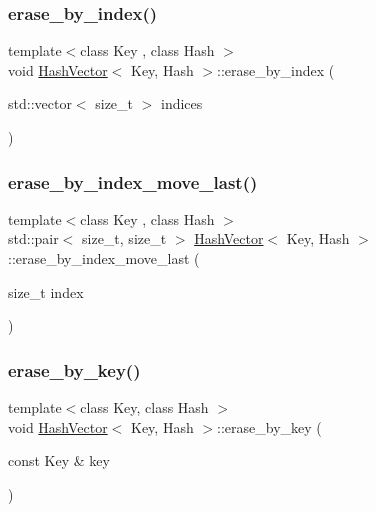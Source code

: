 \mbox{\label{class_hash_vector_aa941ff27b9180bdfb6e5a32defe81f0a}} 
\subsubsection{\texorpdfstring{erase\+\_\+by\+\_\+index()}{erase\_by\_index()}\hspace{0.1cm}{\footnotesize\ttfamily [2/2]}}
{\footnotesize\ttfamily template$<$class Key , class Hash $>$ \\
void \mbox{\hyperlink{class_hash_vector}{Hash\+Vector}}$<$ Key, Hash $>$\+::erase\+\_\+by\+\_\+index (\begin{DoxyParamCaption}\item[{std\+::vector$<$ size\+\_\+t $>$}]{indices }\end{DoxyParamCaption})}

\mbox{\label{class_hash_vector_a9c95c963022cb33ba0dff610ac56e655}} 
\subsubsection{\texorpdfstring{erase\+\_\+by\+\_\+index\+\_\+move\+\_\+last()}{erase\_by\_index\_move\_last()}}
{\footnotesize\ttfamily template$<$class Key , class Hash $>$ \\
std\+::pair$<$ size\+\_\+t, size\+\_\+t $>$ \mbox{\hyperlink{class_hash_vector}{Hash\+Vector}}$<$ Key, Hash $>$\+::erase\+\_\+by\+\_\+index\+\_\+move\+\_\+last (\begin{DoxyParamCaption}\item[{size\+\_\+t}]{index }\end{DoxyParamCaption})}

\mbox{\label{class_hash_vector_afe9cb230bcd8339578a6662f92b32a4e}} 
\subsubsection{\texorpdfstring{erase\+\_\+by\+\_\+key()}{erase\_by\_key()}\hspace{0.1cm}{\footnotesize\ttfamily [1/2]}}
{\footnotesize\ttfamily template$<$class Key, class Hash $>$ \\
void \mbox{\hyperlink{class_hash_vector}{Hash\+Vector}}$<$ Key, Hash $>$\+::erase\+\_\+by\+\_\+key (\begin{DoxyParamCaption}\item[{const Key \&}]{key }\end{DoxyParamCaption})}

